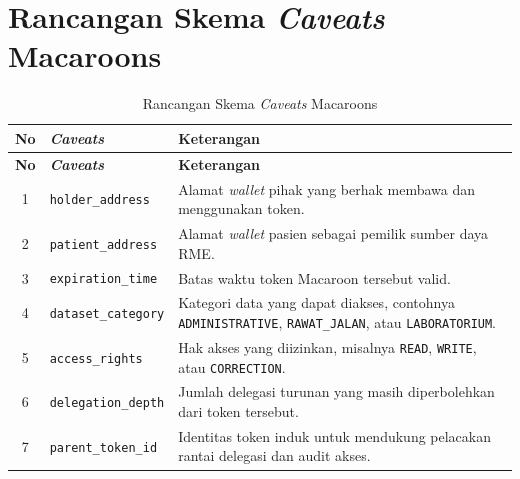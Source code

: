 \chapter{Rancangan Skema \textit{Caveats} Macaroons}
\label{lampiran:skema-caveats}

\begin{longtable}{|c|>{\raggedright\arraybackslash}p{4cm}|>{\raggedright\arraybackslash}p{8cm}|}
    \caption{Rancangan Skema \textit{Caveats} Macaroons} \label{tab:skema-caveats}                                                                                           \\
    \hline
    \textbf{No} & \textbf{\textit{Caveats}}            & \textbf{Keterangan}                                                                                                 \\
    \hline
    \endfirsthead
    \hline
    \textbf{No} & \textbf{\textit{Caveats}}            & \textbf{Keterangan}                                                                                                 \\
    \hline
    \endhead
    1           & \texttt{holder\_address}    & Alamat \textit{wallet} pihak yang berhak membawa dan menggunakan token.                                             \\ \hline
    2           & \texttt{patient\_address}   & Alamat \textit{wallet} pasien sebagai pemilik sumber daya RME.                                                      \\ \hline
    3           & \texttt{expiration\_time}   & Batas waktu token Macaroon tersebut valid.                                                                          \\ \hline
    4           & \texttt{dataset\_category}  & Kategori data yang dapat diakses, contohnya \texttt{ADMINISTRATIVE}, \texttt{RAWAT\_JALAN}, atau \texttt{LABORATORIUM}. \\ \hline
    5           & \texttt{access\_rights}     & Hak akses yang diizinkan, misalnya \texttt{READ}, \texttt{WRITE}, atau \texttt{CORRECTION}.                        \\ \hline
    6           & \texttt{delegation\_depth}  & Jumlah delegasi turunan yang masih diperbolehkan dari token tersebut.                                               \\ \hline
    7           & \texttt{parent\_token\_id}  & Identitas token induk untuk mendukung pelacakan rantai delegasi dan audit akses.                                   \\ \hline
\end{longtable}

